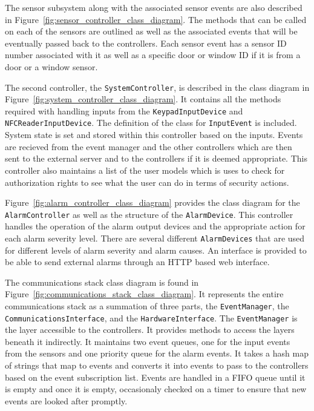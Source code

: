 \documentclass{report}
\begin{document}
The sensor subsystem along with the associated sensor events are also described
in Figure~\ref{fig:sensor_controller_class_diagram}. The methods that can be
called on each of the sensors are outlined as well as the associated events that
will be eventually passed back to the controllers. Each sensor event has a
sensor ID number associated with it as well as a specific door or window ID
if it is from a door or a window sensor.

The second controller, the \texttt{SystemController}, is described in the class
diagram in Figure~\ref{fig:system_controller_class_diagram}. It contains all
the methods required with handling inputs from the \texttt{KeypadInputDevice}
and \texttt{NFCReaderInputDevice}. The definition of the class for
\texttt{InputEvent} is included. System state is set and stored within this
controller based on the inputs. Events are recieved from the event manager and
the other controllers which are then sent to the external server and to the
controllers if it is deemed appropriate. This controller also maintains a list
of the user models which is uses to check for authorization rights to see what
the user can do in terms of security actions.

Figure~\ref{fig:alarm_controller_class_diagram} provides the class diagram for
the \texttt{AlarmController} as well as the structure of the
\texttt{AlarmDevice}. This controller handles the operation of the alarm output
devices and the appropriate action for each alarm severity level. There are
several different \texttt{AlarmDevices} that are used for different levels of
alarm severity and alarm causes. An interface is provided to be able to send
external alarms through an HTTP based web interface.

The communications stack class diagram is found in
Figure~\ref{fig:communications_stack_class_diagram}. It represents the entire
communications stack as a summation of three parts, the \texttt{EventManager},
the \texttt{CommunicationsInterface}, and the \texttt{HardwareInterface}. The
\texttt{EventManager} is the layer accessible to the controllers. It provides
methods to access the layers beneath it indirectly. It maintains two event
queues, one for the input events from the sensors and one priority queue for
the alarm events. It takes a hash map of strings that map to events and
converts it into events to pass to the controllers based on the event
subscription list. Events are handled in a FIFO queue until it is empty and
once it is empty, occasionaly checked on a timer to ensure that new events are
looked after promptly.
\end{document}
